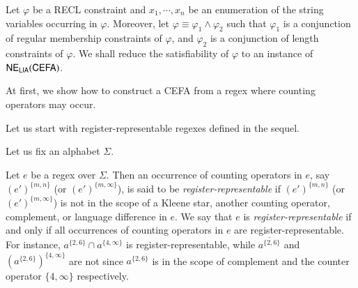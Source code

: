 Let $\varphi$ be a RECL constraint and $x_1, \cdots, x_n$ be an enumeration of the string variables occurring in $\varphi$. Moreover, let $\varphi \equiv \varphi_1 \wedge \varphi_2$ such that $\varphi_1$ is a conjunction of regular membership constraints of $\varphi$, and $\varphi_2$ is a conjunction of length constraints of $\varphi$.
We shall reduce the satisfiability of $\varphi$ to an instance of ${\sf NE_{LIA}(CEFA)}$. 

At first, we show how to construct a CEFA from a regex where counting operators may occur. 

Let us start with register-representable regexes defined in the sequel. 

Let us fix an alphabet $\Sigma$.

Let $e$ be a regex over $\Sigma$. Then an occurrence of counting operators in $e$, say $(e')^{\{m,n\}}$ (or $(e')^{\{m, \infty\}}$), is said to be \emph{register-representable} if $(e')^{\{m,n\}}$ (or $(e')^{\{m, \infty\}}$) is not in the scope of a Kleene star, another counting operator, complement, or language difference in $e$. We say that $e$ is \emph{register-representable} if and only if all occurrences of counting operators in $e$ are register-representable. For instance, $a^{\{2, 6\}} \cap a^{\{4, \infty\}}$ is register-representable, while $\overline{a^{\{2, 6\}}}$ and $(a^{\{2, 6\}})^{\{4,\infty\}}$ are not since $a^{\{2,6\}}$ is in the scope of complement and the counter operator $\{4, \infty\}$ respectively.  

